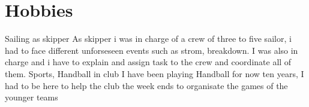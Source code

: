 \documentclass{friggeri-cv}
\begin{document}
\section{Hobbies}
\begin{entrylist}
	\entry  {} {Sailing as skipper} {}
	{
		As skipper i was in charge of a crew of three to five sailor, i had to face different unforseseen events such as strom, breakdown.
		I was also in charge and i have to explain and assign task to the crew and coordinate all of them.
	}
	\entry  {} {Sports, Handball in club} {} {I have been playing Handball for now ten years, I had to be here to help the club the week ends to organisate the games of the younger teams}
\end{entrylist}
\end{document}
